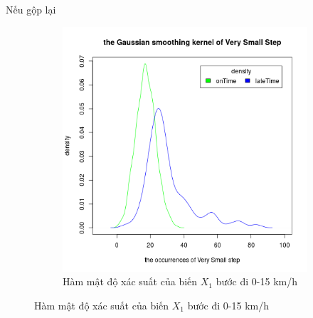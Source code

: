 \documentclass[a4paper, 13pt]{report}
\begin{document}
\FloatBarrier
Nếu gộp lại \\
\FloatBarrier
\begin{figure}[h]
    \begin{subfigure}[b]{0.7\textwidth}
        \includegraphics[width=\textwidth]{DensityVerySmallStep.png}
        \caption*{Hàm mật độ xác suất của biến $X_1$ bước đi 0-15 km/h}
    \end{subfigure}
\end{figure}
\FloatBarrier
\FloatBarrier
\end{document}
